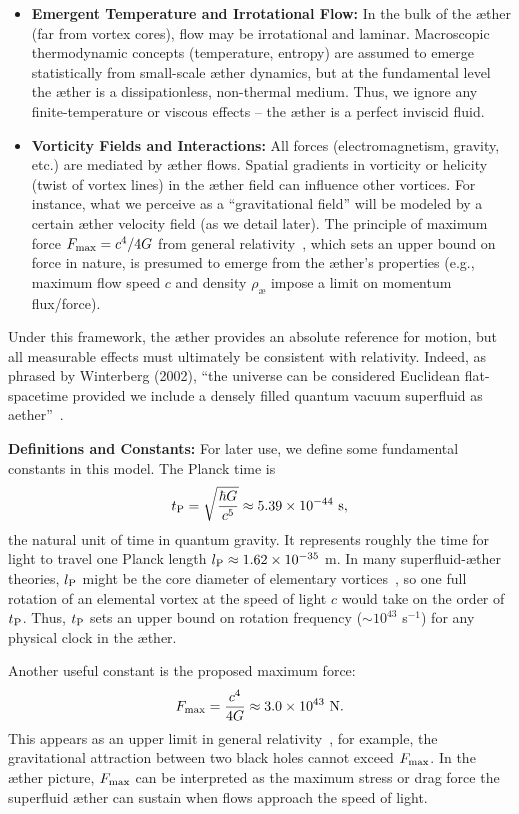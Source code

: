 \begin{itemize}
    \item \textbf{Emergent Temperature and Irrotational Flow:} In the bulk of the æther (far from vortex cores), flow may be irrotational and laminar. Macroscopic thermodynamic concepts (temperature, entropy) are assumed to emerge statistically from small-scale æther dynamics, but at the fundamental level the æther is a dissipationless, non-thermal medium. Thus, we ignore any finite-temperature or viscous effects – the æther is a perfect inviscid fluid.

    \item \textbf{Vorticity Fields and Interactions:} All forces (electromagnetism, gravity, etc.) are mediated by æther flows. Spatial gradients in vorticity or helicity (twist of vortex lines) in the æther field can influence other vortices. For instance, what we perceive as a “gravitational field” will be modeled by a certain æther velocity field (as we detail later). The principle of maximum force $F_{\rm max} = c^4 / 4G$ from general relativity~\cite{Schiller2022-maxforce}, which sets an upper bound on force in nature, is presumed to emerge from the æther’s properties (e.g., maximum flow speed $c$ and density $\rho_{\text{\ae}}$ impose a limit on momentum flux/force).
\end{itemize}

Under this framework, the æther provides an absolute reference for motion, but all measurable effects must ultimately be consistent with relativity. Indeed, as phrased by Winterberg (2002), ``the universe can be considered Euclidean flat-spacetime provided we include a densely filled quantum vacuum superfluid as aether''~\cite{Winterberg2002-PlanckAether}.

\textbf{Definitions and Constants:} For later use, we define some fundamental constants in this model. The Planck time is
\[
t_{\rm P} = \sqrt{\frac{\hbar G}{c^5}} \approx 5.39\times10^{-44}\ \text{s},
\]
the natural unit of time in quantum gravity. It represents roughly the time for light to travel one Planck length $l_{\rm P} \approx 1.62\times10^{-35}$ m. In many superfluid-æther theories, $l_{\rm P}$ might be the core diameter of elementary vortices~\cite{Winterberg2002-PlanckAether}, so one full rotation of an elemental vortex at the speed of light $c$ would take on the order of $t_{\rm P}$. Thus, $t_{\rm P}$ sets an upper bound on rotation frequency ($\sim 10^{43}$ s$^{-1}$) for any physical clock in the æther.

Another useful constant is the proposed maximum force:
\[
F_{\rm max} = \frac{c^4}{4G} \approx 3.0\times10^{43}\ \text{N}.
\]
This appears as an upper limit in general relativity~\cite{Schiller2022-maxforce}, for example, the gravitational attraction between two black holes cannot exceed $F_{\rm max}$. In the æther picture, $F_{\rm max}$ can be interpreted as the maximum stress or drag force the superfluid æther can sustain when flows approach the speed of light.

